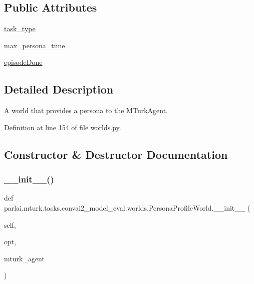 \subsection*{Public Attributes}
\begin{DoxyCompactItemize}
\item 
\hyperlink{classparlai_1_1mturk_1_1tasks_1_1convai2__model__eval_1_1worlds_1_1PersonaProfileWorld_af482933a082195bce55b2e1aa9acc655}{task\+\_\+type}
\item 
\hyperlink{classparlai_1_1mturk_1_1tasks_1_1convai2__model__eval_1_1worlds_1_1PersonaProfileWorld_a54ca0ba78081ea9c21830464fbefe989}{max\+\_\+persona\+\_\+time}
\item 
\hyperlink{classparlai_1_1mturk_1_1tasks_1_1convai2__model__eval_1_1worlds_1_1PersonaProfileWorld_aa2f2d6ce0bde9d360668fc44378b248b}{episode\+Done}
\end{DoxyCompactItemize}


\subsection{Detailed Description}
\begin{DoxyVerb}A world that provides a persona to the MTurkAgent.
\end{DoxyVerb}
 

Definition at line 154 of file worlds.\+py.



\subsection{Constructor \& Destructor Documentation}
\mbox{\label{classparlai_1_1mturk_1_1tasks_1_1convai2__model__eval_1_1worlds_1_1PersonaProfileWorld_ae78876910c6b8572ec62f825015167c1}} 
\subsubsection{\texorpdfstring{\+\_\+\+\_\+init\+\_\+\+\_\+()}{\_\_init\_\_()}}
{\footnotesize\ttfamily def parlai.\+mturk.\+tasks.\+convai2\+\_\+model\+\_\+eval.\+worlds.\+Persona\+Profile\+World.\+\_\+\+\_\+init\+\_\+\+\_\+ (\begin{DoxyParamCaption}\item[{}]{self,  }\item[{}]{opt,  }\item[{}]{mturk\+\_\+agent }\end{DoxyParamCaption})}



